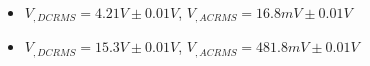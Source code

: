 \begin{itemize}
     \item $V_{, DCRMS}=4.21V\pm 0.01\unit{V}$, $V_{, ACRMS}=16.8mV\pm 0.01\unit{V}$ 
     \item $V_{, DCRMS}=15.3V\pm 0.01\unit{V}$, $V_{, ACRMS}=481.8mV\pm 0.01\unit{V}$\\
\end{itemize}